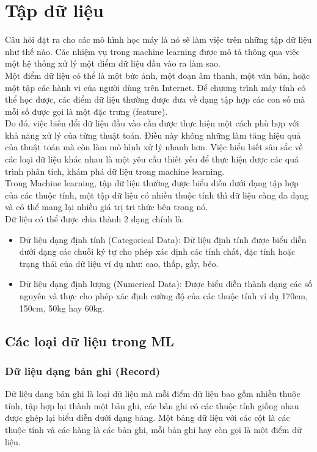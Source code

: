 \section{Tập dữ liệu}
Câu hỏi đặt ra cho các mô hình học máy là nó sẽ làm việc trên những tập dữ liệu như thế nào. Các nhiệm vụ trong machine learning được mô tả thông qua việc một hệ thống xử lý một điểm dữ liệu đầu vào ra làm sao.\\
Một điểm dữ liệu có thể là một bức ảnh, một đoạn âm thanh, một văn bản, hoặc
một tập các hành vi của người dùng trên Internet. Để chương trình máy tính có thể học được, các điểm dữ liệu thường được đưa về dạng tập hợp các con số mà mỗi số được gọi là một đặc trưng (feature).\\
Do đó, việc biến đổi dữ liệu đầu vào cần được thực hiện một cách phù hợp với khả năng xử lý của từng thuật toán. Điều này không những làm tăng hiệu quả của thuật toán mà còn làm mô hình xử lý nhanh hơn. Việc hiểu biết sâu sắc về các loại dữ liệu khác nhau là một yêu cầu thiết yếu để thực hiện được các quá trình phân tích, khám phá dữ liệu trong machine learning.\\
Trong Machine learning, tập dữ liệu thường được biểu diễn dưới dạng tập hợp của các thuộc tính, một tập dữ liệu có nhiều thuộc tính thì dữ liệu càng đa dạng và có thể mang lại nhiều giá trị tri thức bên trong nó.\\
Dữ liệu có thể được chia thành 2 dạng chính là:
\begin{itemize}
    \item Dữ liệu dạng định tính (Categorical Data): Dữ liệu định tính được biểu diễn dưới dạng các chuỗi ký tự cho phép xác định các tính chất, đặc tính hoặc trạng thái của dữ liệu ví dụ như: cao, thấp, gầy, béo.
    \item Dữ liệu dạng định lượng (Numerical Data): Được biểu diễn thành dạng các số nguyên và thực cho phép xác định cường độ của các thuộc tính ví dụ 170cm, 150cm, 50kg hay 60kg.
\end{itemize}
\subsection{Các loại dữ liệu trong ML}
\subsubsection{Dữ liệu dạng bản ghi (Record)}
Dữ liệu dạng bản ghi là loại dữ liệu mà mỗi điểm dữ liệu bao gồm nhiều thuộc tính, tập hợp lại thành một bản ghi, các bản ghi có các thuộc tính giống nhau được ghép lại biểu diễn dưới dạng bảng. Một bảng dữ liệu với các cột là các thuộc tính và các hàng là các bản ghi, mỗi bản ghi hay còn gọi là một điểm dữ liệu.
